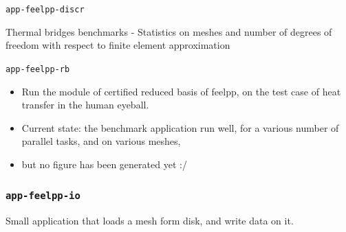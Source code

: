 \documentclass[aspectratio=169]{beamer}
\begin{document}
\begin{frame}{\texttt{app-feelpp-discr}}
{
\begin{table}[!ht]
    \centering

  \caption{Thermal bridges benchmarks - Statistics on meshes and number of degrees of freedom with respect to finite element approximation}
  \label{tab:wp1:feelpp:thermal_bridges:discr_stat}
\end{table}
}



\end{frame}

\begin{frame}{\texttt{app-feelpp-rb}}

  \begin{itemize}
    \item Run the module of certified reduced basis of feelpp, on the test case of heat transfer in the human eyeball.
    \item Current state: the benchmark application run well, for a various number of parallel tasks, and on various meshes,
    \item but no figure has been generated yet :/
  \end{itemize}

\end{frame}


\begin{frame}
  \frametitle{\texttt{app-feelpp-io}}

  Small application that loads a mesh form disk, and write data on it.

  

\end{frame}
\end{document}
